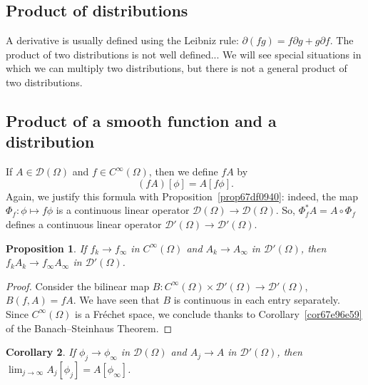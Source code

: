 \documentclass[a4paper,9pt]{amsart}
\newcommand{\scr}[1]{\mathscr{#1}}
\newcommand{\de}{\partial}		%
\newcommand{\TODO}{{\bf\color{Red}TODO}}
\theoremstyle{plain}
\newtheorem{proposition}{Proposition}[section]
\newtheorem{corollary}[proposition]{Corollary}
\theoremstyle{definition}
\theoremstyle{remark}
\begin{document}
\subsection{Product of distributions}\label{sub67df2561}
A derivative is usually defined using the Leibniz rule: $\de(fg) = f\de g + g\de f$.
The product of two distributions is not well defined... We will see special situations in which we can multiply two distributions, but there is not a general product of two distributions.

\subsection{Product of a smooth function and a distribution}\label{subs67df2598}
If $A\in\scr D(\Omega)$ and $f\in C^\infty(\Omega)$, then we define $fA$ by
\begin{equation}
	(fA)[\phi] = A[f\phi] .
\end{equation}
Again, we justify this formula with Proposition~\ref{prop67df0940}:
indeed, the map $\Phi_f:\phi\mapsto f\phi$ is a continuous linear operator $\scr D(\Omega)\to\scr D(\Omega)$.
So, $\Phi_f^*A = A\circ\Phi_f$ defines a continuous linear operator $\scr D'(\Omega)\to\scr D'(\Omega)$.

\begin{proposition}\label{prop67e267de}
	If $f_k\to f_\infty$ in $C^\infty(\Omega)$ and $A_k\to A_\infty$ in $\scr D'(\Omega)$,
	then $f_kA_k\to f_\infty A_\infty$ in $\scr D'(\Omega)$.
\end{proposition}
\begin{proof}
	Consider the bilinear map $B:C^\infty(\Omega)\times \scr D'(\Omega)\to \scr D'(\Omega)$,
	$B(f,A) = fA$.
	We have seen that $B$ is continuous in each entry separately.
	Since $C^\infty(\Omega)$ is a Fréchet space, we conclude thanks to Corollary~\ref{cor67e96e59} of the Banach--Steinhaus Theorem.
\end{proof}

\begin{corollary}\label{cor67e265dd}
	If $\phi_j\to\phi_\infty$ in $\scr D(\Omega)$ and $A_j\to A$ in $\scr D'(\Omega)$,
	then $\lim_{j\to\infty} A_j[\phi_j] = A[\phi_\infty]$.
\end{corollary}
\end{document}
